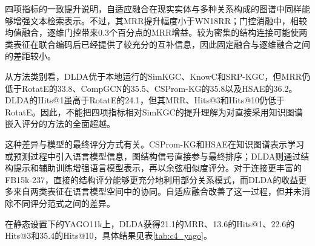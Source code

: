 四项指标的一致提升说明，自适应融合在现实实体与多种关系构成的图谱中同样能够增强文本检索表示。不过，其MRR提升幅度小于WN18RR；门控消融中，相较均值融合，逐维门控带来0.3个百分点的MRR增益。较为密集的结构连接可能使两类表征在联合编码后已经提供了较充分的互补信息，因此固定融合与逐维融合之间的差距较小。

从方法类别看，DLDA优于本地运行的SimKGC、KnowC和SRP-KGC，但MRR仍低于RotatE的33.8、CompGCN的35.5、CSProm-KG的35.8以及HSAE的36.2。DLDA的Hits@1虽高于RotatE的24.1，但其MRR、Hits@3和Hits@10仍低于RotatE。因此，不能把四项指标相对SimKGC的提升理解为对直接采用知识图谱嵌入评分的方法的全面超越。

这种差异与模型的最终评分方式有关。CSProm-KG和HSAE在知识图谱表示学习或预测过程中引入语言模型信息，图结构信号直接参与最终排序；DLDA则通过结构提示和辅助训练增强语言模型表示，再以余弦相似度评分。对于连接更丰富的FB15k-237，直接的结构评分能够更充分地利用部分关系模式，而DLDA的收益更多来自两类表征在语言模型空间中的协同。自适应融合改善了这一过程，但并未消除不同评分范式之间的差异。



在静态设置下的YAGO11k上，DLDA获得21.1的MRR、13.6的Hits@1、22.6的Hits@3和35.4的Hits@10，具体结果见表\ref{tab:c4_yago}。

